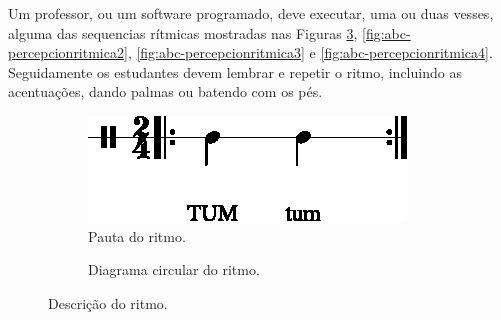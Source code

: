 \begin{example}
Um professor, ou um software programado, 
deve executar, uma ou duas vesses, alguma das sequencias rítmicas mostradas nas Figuras 
\ref{fig:abc-percepcionritmica1}, \ref{fig:abc-percepcionritmica2},
\ref{fig:abc-percepcionritmica3}  e \ref{fig:abc-percepcionritmica4}.
Seguidamente os estudantes devem lembrar e repetir o ritmo, 
incluindo as acentuações, dando palmas ou batendo com os pés.
\end{example}


\begin{figure}[H]
\centering
     \begin{subfigure}[c]{0.45\textwidth}
         \centering
         \includegraphics[width=\textwidth]{chapters/cap-musicalidade-percepcion/treino-ritmo1-1.eps}
         \caption{Pauta do ritmo.}
         \label{fig:RitmoTUMtum1}
     \end{subfigure}
     \hfill
     \begin{subfigure}[c]{0.45\textwidth}
         \centering
{}
         \caption{Diagrama circular do ritmo.}
         \label{fig:RitmoTUMtum2}
     \end{subfigure}
\caption{Descrição do ritmo.}
\label{fig:abc-percepcionritmica1}
\end{figure}


